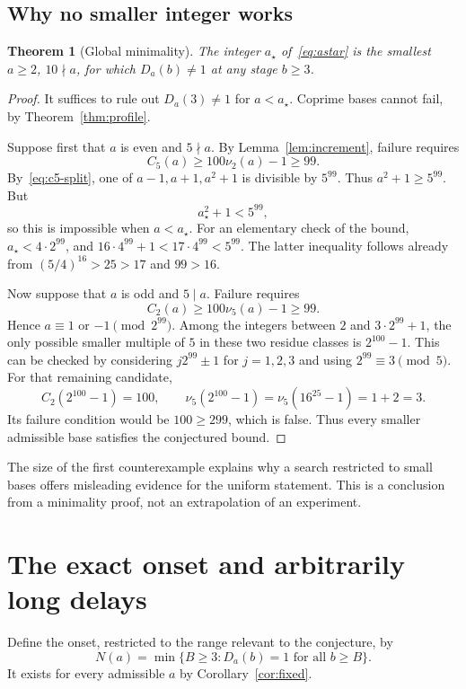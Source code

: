 \documentclass[11pt,a4paper]{article}
\newtheorem{theorem}{Theorem}[section]
\theoremstyle{definition}
\newcommand{\astar}{a_{\star}}
\begin{document}
\subsection{Why no smaller integer works}
\begin{theorem}[Global minimality]\label{thm:minimal}
The integer $\astar$ of~\eqref{eq:astar} is the smallest $a\ge2$, $10\nmid a$,
for which $D_a(b)\ne1$ at any stage $b\ge3$.
\end{theorem}
\begin{proof}
It suffices to rule out $D_a(3)\ne1$ for $a<\astar$.
Coprime bases cannot fail, by Theorem~\ref{thm:profile}.

Suppose first that $a$ is even and $5\nmid a$. By Lemma~\ref{lem:increment},
failure requires
\[
C_5(a)\ge100\nu_2(a)-1\ge99.
\]
By~\eqref{eq:c5-split}, one of $a-1,a+1,a^2+1$ is divisible by $5^{99}$.
Thus $a^2+1\ge5^{99}$. But
\begin{equation}\label{eq:small-bound}
\astar^2+1<5^{99},
\end{equation}
so this is impossible when $a<\astar$. For an elementary check of the
bound, $\astar<4\cdot2^{99}$, and
$16\cdot4^{99}+1<17\cdot4^{99}<5^{99}$.
The latter inequality follows already from $(5/4)^{16}>25>17$ and $99>16$.

Now suppose that $a$ is odd and $5\mid a$. Failure requires
\[
C_2(a)\ge100\nu_5(a)-1\ge99.
\]
Hence $a\equiv1$ or $-1\pmod{2^{99}}$. Among the integers between $2$ and
$3\cdot2^{99}+1$, the only possible smaller multiple of $5$ in these two
residue classes is $2^{100}-1$. This can be checked by considering
$j2^{99}\pm1$ for $j=1,2,3$ and using $2^{99}\equiv3\pmod5$.
For that remaining candidate,
\[
C_2(2^{100}-1)=100,
\qquad
\nu_5(2^{100}-1)=\nu_5(16^{25}-1)=1+2=3.
\]
Its failure condition would be $100\ge299$, which is false.
Thus every smaller admissible base satisfies the conjectured bound.
\end{proof}

The size of the first counterexample explains why a search restricted to
small bases offers misleading evidence for the uniform statement. This is
a conclusion from a minimality proof, not an extrapolation of an experiment.

\section{The exact onset and arbitrarily long delays}\label{sec:onset}

Define the onset, restricted to the range relevant to the conjecture, by
\begin{equation}\label{eq:onset-def}
N(a)=\min\{B\ge3:D_a(b)=1\text{ for all }b\ge B\}.
\end{equation}
It exists for every admissible $a$ by Corollary~\ref{cor:fixed}.
\end{document}

